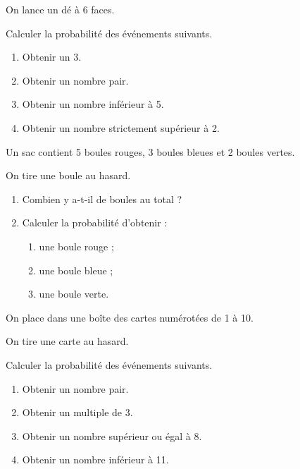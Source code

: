 \documentclass[11pt]{article}
\begin{document}
\newpage


\begin{exercice}

On lance un dé à 6 faces.

Calculer la probabilité des événements suivants.

\begin{enumerate}
    \item Obtenir un 3.
    \item Obtenir un nombre pair.
    \item Obtenir un nombre inférieur à 5.
    \item Obtenir un nombre strictement supérieur à 2.
\end{enumerate}

\end{exercice}


\begin{exercice}

Un sac contient 5 boules rouges, 3 boules bleues et 2 boules vertes.

On tire une boule au hasard.

\begin{enumerate}
    \item Combien y a-t-il de boules au total ?
    \item Calculer la probabilité d'obtenir :
    \begin{enumerate}
        \item une boule rouge ;
        \item une boule bleue ;
        \item une boule verte.
    \end{enumerate}
\end{enumerate}

\end{exercice}


\begin{exercice}

On place dans une boîte des cartes numérotées de 1 à 10.

On tire une carte au hasard.

Calculer la probabilité des événements suivants.

\begin{enumerate}
    \item Obtenir un nombre pair.
    \item Obtenir un multiple de 3.
    \item Obtenir un nombre supérieur ou égal à 8.
    \item Obtenir un nombre inférieur à 11.
\end{enumerate}

\end{exercice}
\end{document}
